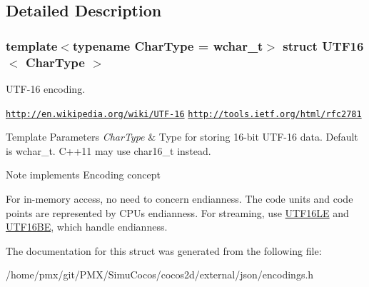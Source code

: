\subsection{Detailed Description}
\subsubsection*{template$<$typename Char\+Type = wchar\+\_\+t$>$\newline
struct U\+T\+F16$<$ Char\+Type $>$}

U\+T\+F-\/16 encoding. 

\href{http://en.wikipedia.org/wiki/UTF-16}{\tt http\+://en.\+wikipedia.\+org/wiki/\+U\+T\+F-\/16} \href{http://tools.ietf.org/html/rfc2781}{\tt http\+://tools.\+ietf.\+org/html/rfc2781} 
\begin{DoxyTemplParams}{Template Parameters}
{\em Char\+Type} & Type for storing 16-\/bit U\+T\+F-\/16 data. Default is wchar\+\_\+t. C++11 may use char16\+\_\+t instead. \\
\hline
\end{DoxyTemplParams}
\begin{DoxyNote}{Note}
implements Encoding concept

For in-\/memory access, no need to concern endianness. The code units and code points are represented by C\+PU\textquotesingle{}s endianness. For streaming, use \hyperlink{structUTF16LE}{U\+T\+F16\+LE} and \hyperlink{structUTF16BE}{U\+T\+F16\+BE}, which handle endianness. 
\end{DoxyNote}


The documentation for this struct was generated from the following file\+:\begin{DoxyCompactItemize}
\item 
/home/pmx/git/\+P\+M\+X/\+Simu\+Cocos/cocos2d/external/json/encodings.\+h\end{DoxyCompactItemize}
